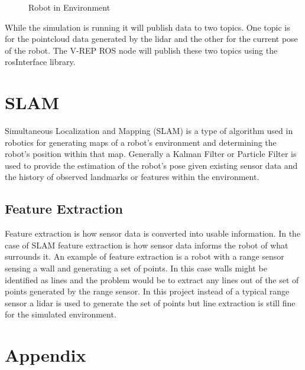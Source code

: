 \documentclass{article}
\begin{document}
\begin{multicols*}{2}
\begin{figure}[H]
  \caption{Robot in Environment}
\end{figure}
\noindent While the simulation is running it will publish data to two topics. One topic is for the pointcloud data generated by the lidar and the other for the current pose of the robot. The V-REP ROS node will publish these two topics using the rosInterface library. 

\section{SLAM}
Simultaneous Localization and Mapping (SLAM) is a type of algorithm used in robotics for generating maps of a robot's environment and determining the robot's position within that map. Generally a Kalman Filter or Particle Filter is used to provide the estimation of the robot's pose given existing sensor data and the history of observed landmarks or features within the environment.  
\subsection{Feature Extraction}
Feature extraction is how sensor data is converted into usable information. In the case of SLAM feature extraction is how sensor data informs the robot of what surrounds it. An example of feature extraction is a robot with a range sensor sensing a wall and generating a set of points. In this case walls might be identified as lines and the problem would be to extract any lines out of the set of points generated by the range sensor. In this project instead of a typical range sensor a lidar is used to generate the set of points but line extraction is still fine for the simulated environment. 
\section{Appendix}

\end{multicols*}
\end{document}
